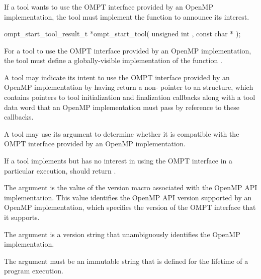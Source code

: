 \subsubsection{}
\label{sec:ompt_start_tool}

\summary
If a tool wants to use the OMPT interface provided by an OpenMP implementation,
the tool must implement the function  to announce its interest.

\format

\begin{cspecific}
\begin{omptOther}
ompt_start_tool_result_t *ompt_start_tool(
  unsigned int ,
  const char *
);
\end{omptOther}
\end{cspecific}


\descr
For a tool to use the OMPT interface provided by an OpenMP implementation,
the tool must define a globally-visible implementation of the
function .

A tool may indicate its intent to use the OMPT interface provided
by an OpenMP implementation by having
 return a non- pointer to an
 structure, which contains pointers to
tool initialization and finalization callbacks along with
a tool data word that an OpenMP implementation must pass by reference
to these callbacks.

A tool may use its argument  to determine
whether it is compatible with the OMPT interface provided by an OpenMP
implementation.

If a tool implements  but has no interest in using
the OMPT interface in a particular execution,
 should return . 

\argdesc

The argument  
is the value of the  version macro 
associated with the OpenMP API implementation. This value 
identifies the OpenMP API version supported by an OpenMP implementation,
which specifies the version of the OMPT interface that it supports.

The argument 
is a version string that unambiguously identifies the OpenMP implementation.

\constraints

The argument  must be
an immutable string that is defined for the lifetime of a program
execution.


